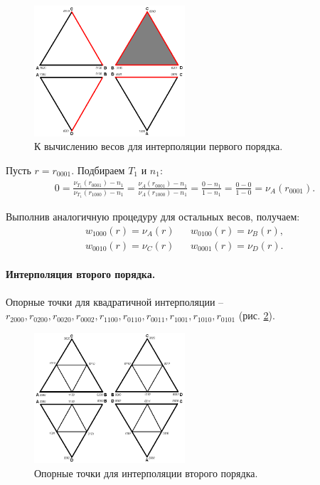 \begin{figure}[h]
\centering
\includegraphics[width=0.5\textwidth]{png/tetr-interp-1st-order-2.png}
\caption{К вычислению весов для интерполяции первого порядка.}
\label{pic:tetr-interpolation-1st-order-2}
\end{figure}

Пусть $r = r_{0001}$. Подбираем $T_1$ и $n_1$:
\begin{align}
0 = \frac{ \nu_{T_1}(r_{0001}) - n_1 }{ \nu_{T_1}(r_{1000}) - n_1 } = \frac{ \nu_{A}(r_{0001}) - n_1 }{ \nu_{A}(r_{1000}) - n_1 } = \frac{0-n_1}{1-n_1} = \frac{0-0}{1-0} = \nu_{A}(r_{0001}).
\end{align}

Выполнив аналогичную процедуру для остальных весов, получаем:
\begin{align}
w_{1000}(r) = \nu_{A}(r) & & w_{0100}(r) = \nu_{B}(r), \nonumber\\
w_{0010}(r) = \nu_{C}(r) & & w_{0001}(r) = \nu_{D}(r).
\end{align}


\paragraph{Интерполяция второго порядка.} Опорные точки для квадратичной интерполяции -- $r_{2000}, r_{0200}, r_{0020}, r_{0002}, r_{1100}, r_{0110}, r_{0011}, r_{1001}, r_{1010}, r_{0101}$ (рис. \ref{pic:tetr-interpolation-2nd-order-1}).

\begin{figure}[h]
\centering
\includegraphics[width=0.5\textwidth]{png/tetr-interp-2nd-order-1.png}
\caption{Опорные точки для интерполяции второго порядка.}
\label{pic:tetr-interpolation-2nd-order-1}
\end{figure}


